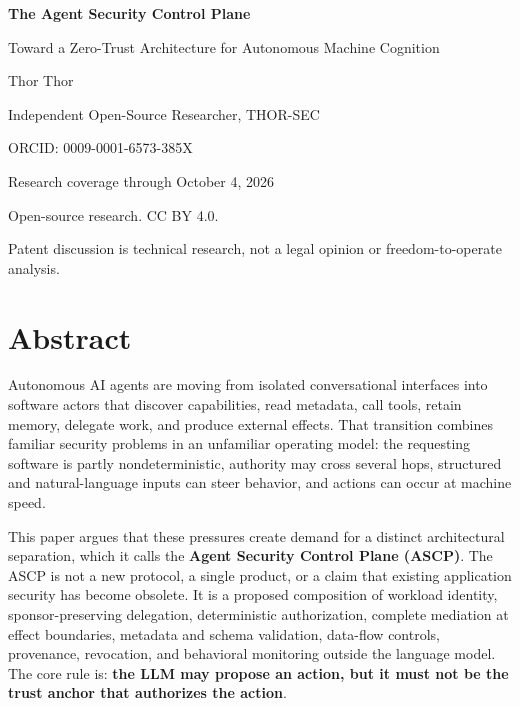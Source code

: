 \documentclass[
  10pt,
  letterpaper,
]{article}
\author{}
\date{}
\begin{document}

\begin{titlepage}
\thispagestyle{empty}
\centering
\vspace*{1.0in}
{\Huge\bfseries The Agent Security Control Plane\par}
\vspace{0.25in}
{\LARGE Toward a Zero-Trust Architecture for Autonomous Machine Cognition\par}
\vspace{0.65in}
{\Large Thor Thor\par}
\vspace{0.10in}
{\large Independent Open-Source Researcher, THOR-SEC\par}
\vspace{0.50in}
{\normalsize ORCID: 0009-0001-6573-385X\par}
\vspace{0.15in}
{\normalsize Research coverage through October 4, 2026\par}
\vfill
{\small Open-source research. CC BY 4.0.\par}
{\small Patent discussion is technical research, not a legal opinion or freedom-to-operate analysis.\par}
\end{titlepage}

\tableofcontents
\newpage

\section{Abstract}\label{abstract}

Autonomous AI agents are moving from isolated conversational interfaces
into software actors that discover capabilities, read metadata, call
tools, retain memory, delegate work, and produce external effects. That
transition combines familiar security problems in an unfamiliar
operating model: the requesting software is partly nondeterministic,
authority may cross several hops, structured and natural-language inputs
can steer behavior, and actions can occur at machine speed.

This paper argues that these pressures create demand for a distinct
architectural separation, which it calls the \textbf{Agent Security
Control Plane (ASCP)}. The ASCP is not a new protocol, a single product,
or a claim that existing application security has become obsolete. It is
a proposed composition of workload identity, sponsor-preserving
delegation, deterministic authorization, complete mediation at effect
boundaries, metadata and schema validation, data-flow controls,
provenance, revocation, and behavioral monitoring outside the language
model. The core rule is: \textbf{the LLM may propose an action, but it
must not be the trust anchor that authorizes the action}.
\end{document}
